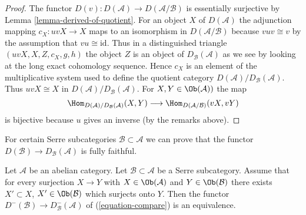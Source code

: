 \begin{proof}
The functor $D(v) : D(\mathcal{A}) \to D(\mathcal{A}/\mathcal{B})$
is essentially surjective by
Lemma \ref{lemma-derived-of-quotient}.
For an object $X$ of $D(\mathcal{A})$ the adjunction mapping
$c_X : uvX \to X$ maps to an isomorphism in $D(\mathcal{A}/\mathcal{B})$
because $vuv \cong v$ by the assumption that $vu \cong \text{id}$.
Thus in a distinguished triangle $(uvX, X, Z, c_X, g, h)$ the object
$Z$ is an object of $D_\mathcal{B}(\mathcal{A})$ as we see by looking
at the long exact cohomology sequence.
Hence $c_X$ is an element of the multiplicative system used to define
the quotient category $D(\mathcal{A})/D_\mathcal{B}(\mathcal{A})$.
Thus $uvX \cong X$ in $D(\mathcal{A})/D_\mathcal{B}(\mathcal{A})$.
For $X, Y \in \Ob(\mathcal{A}))$ the map
$$
\Hom_{D(\mathcal{A})/D_\mathcal{B}(\mathcal{A})}(X, Y)
\longrightarrow
\Hom_{D(\mathcal{A}/\mathcal{B})}(vX, vY)
$$
is bijective because $u$ gives an inverse (by the remarks above).
\end{proof}

\noindent
For certain Serre subcategories $\mathcal{B} \subset \mathcal{A}$
we can prove that the functor
$D(\mathcal{B}) \to D_\mathcal{B}(\mathcal{A})$
is fully faithful.

\begin{lemma}
\label{lemma-fully-faithful-embedding}
Let $\mathcal{A}$ be an abelian category. Let $\mathcal{B} \subset \mathcal{A}$
be a Serre subcategory. Assume that for every surjection $X \to Y$
with $X \in \Ob(\mathcal{A})$ and $Y \in \Ob(\mathcal{B})$ there exists
$X' \subset X$, $X' \in \Ob(\mathcal{B})$ which surjects onto $Y$.
Then the functor $D^-(\mathcal{B}) \to D^-_\mathcal{B}(\mathcal{A})$ of
(\ref{equation-compare}) is an equivalence.
\end{lemma}

